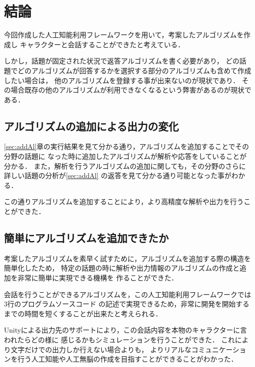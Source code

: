 \section{結論}
今回作成した人工知能利用フレームワークを用いて，考案したアルゴリズムを作成し
キャラクターと会話することができたと考えている．

しかし，話題が固定された状況で返答アルゴリズムを書く必要があり，
どの話題でどのアルゴリズムが回答するかを選択する部分のアルゴリズムも含めて作成したい場合は，
他のアルゴリズムを登録する事が出来ないのが現状であり．
その場合既存の他のアルゴリズムが利用できなくなるという弊害があるのが現状である．

\subsection{アルゴリズムの追加による出力の変化}
\ref{sec:addAl}章の実行結果を見て分かる通り，アルゴリズムを追加することでその分野の話題に
なった時に追加したアルゴリズムが解析や応答をしていることが分かる．
また，解析を行うアルゴリズムの追加に関しても，その分野のさらに詳しい話題の分析が\ref{sec:addAl}
の返答を見て分かる通り可能となった事がわかる．

この通りアルゴリズムを追加することにより，より高精度な解析や出力を行うことができた．

\subsection{簡単にアルゴリズムを追加できたか}
考案したアルゴリズムを素早く試すために，アルゴリズムを追加する際の構造を簡単化したため，
特定の話題の時に解析や出力情報のアルゴリズムの作成と追加を非常に簡単に実現できる機構を
作ることができた．

会話を行うことができるアルゴリズムを，この人工知能利用フレームワークでは3行のプログラムソースコード
の記述で実現できるため，非常に開発を開始するまでの時間を短くすることが出来たと考えられる．

Unityによる出力先のサポートにより，この会話内容を本物のキャラクターに言われたらどの様に
感じるかもシミュレーションを行うことができた．
これにより文字だけでの出力しか行えない場合よりも，
よりリアルなコミュニケーションを行う人工知能や人工無脳の作成を目指すことができることがわかった．
